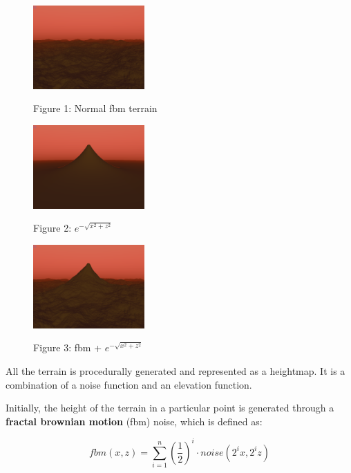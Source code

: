 \documentclass[a4paper,10pt]{article} %
\renewcommand{\b}[1]{%
    {\textbf{#1}}}
\begin{document}
\begin{figure}
    \vspace{-1em}
    \centering
    \includegraphics[width=0.38\textwidth]{fbm2} \par
    Figure 1: Normal fbm terrain \par
    \vspace{1em}

    \includegraphics[width=0.38\textwidth]{elevation2} \par
    Figure 2: $e^{-\sqrt{x^2 + z^2}}$ \par
    \vspace{1em}

    \includegraphics[width=0.38\textwidth]{elevationfbm2} \par
    Figure 3: fbm + $e^{-\sqrt{x^2 + z^2}}$
\end{figure}

\large
All the terrain is procedurally generated and represented as a heightmap. It is a combination of a noise function and an elevation function.

Initially, the height of the terrain in a particular point is generated through a \b{fractal brownian motion} (fbm) noise, which is defined as:

\[
    fbm(x, z) = \sum_{i=1}^{n} \left(\frac{1}{2}\right)^i \cdot noise(2^i x, 2^i z)
\]
\end{document}
